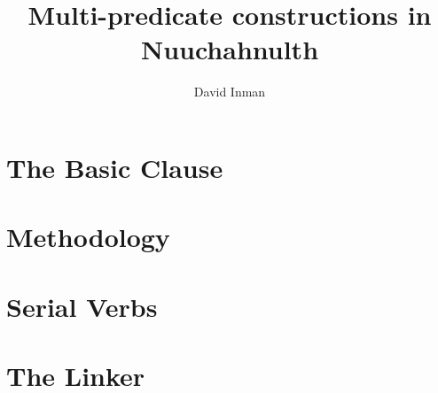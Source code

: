 \documentclass[12pt]{article}
\begin{document}

\avmsortfont{\it}
\avmfont{\sc}
\avmvalfont{\rm}

\setmainfont{Brill}
\title{Multi-predicate constructions in Nuuchahnulth}
\author{David Inman}
\date{}

\maketitle{}

\tableofcontents

%

%

\section{The Basic Clause} \label{sec:clause}


\section{Methodology} \label{sec:methodology}


\section{Serial Verbs} \label{sec:sv}


\section{The Linker} \label{sec:link}








\end{document}
